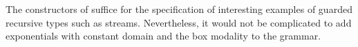 The constructors of   suffice for the specification of interesting examples of guarded recursive types such as streams. Nevertheless, it would not be complicated to add exponentials with
constant domain and the box modality to the grammar.


